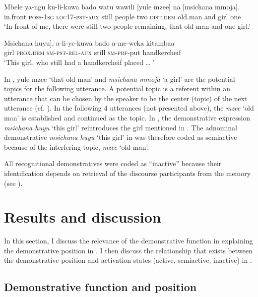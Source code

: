 \documentclass[output=paper,
modfonts
]{langscibook}
\begin{document}
\ea\label{ex:mwamzandi:11}
\gll Mbele ya-ngu ku-li-kuwa bado watu wawili [yule mzee] na [msichana mmoja].\\
     in.front \textsc{poss}{}-\textsc{1sg} \textsc{loc17}{}-\textsc{pst}{}-\textsc{aux} still people two \textsc{dist}.\textsc{dem} old.man and girl one\\
\glt ‘In front of me, there were still two people remaining, that old man and one girl.’
\z

\ea\label{ex:mwamzandi:12}
\gll  {\ob}Msichana huyu], a-li-ye-kuwa bado a-me-weka kitambaa\\
     {\db}girl \textsc{prox}.\textsc{dem} \textsc{sm}{}-\textsc{pst}{}-\textsc{rel}{}-\textsc{aux} still \textsc{sm}{}-\textsc{prf}{}-put handkercheif\\
\glt ‘This girl, who still had a handkercheif placed {\dots} ’
\z

In , yule mzee ‘that old man’ and \textit{msichana mmoja} ‘a girl’ are the potential topics for the following utterance. A potential topic is a referent within an utterance that can be chosen by the speaker to be the center (topic) of the next utterance (cf. \citealt{GroszEtAl1995}). In the following 4 utterances (not presented above), the \textit{mzee} ‘old man’ is established and continued as the topic. In , the demonstrative expression \textit{msichana huyu} ‘this girl’ reintroduces the girl mentioned in . The adnominal demonstrative \textit{msichana huyu} ‘this girl’ in  was therefore coded as semiactive because of the interfering topic, \textit{mzee} ‘old man’.

All recognitional demonstratives were coded as “inactive” because their identification depends on retrieval of the discourse participants from the memory (see ).

\section{Results and discussion}\label{sec:mwamzandi:3}

In this section, I discuss the relevance of the demonstrative function in explaining the demonstrative position in . I then discuss the relationship that exists between the demonstrative position and activation states (active, semiactive, inactive) in .

\subsection{Demonstrative function and position}\label{sec:mwamzandi:3.1}
\end{document}
